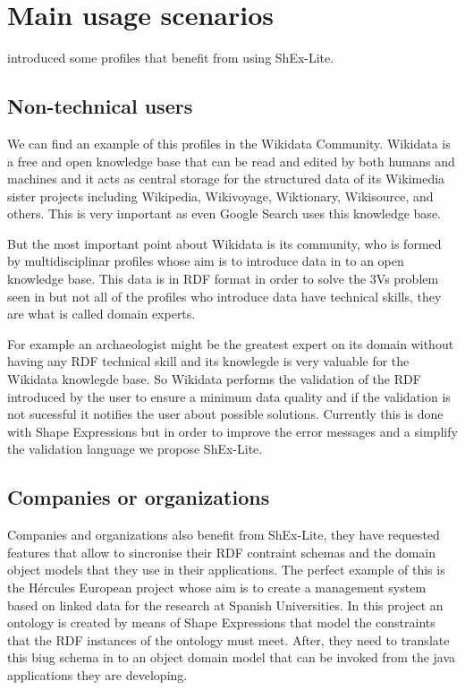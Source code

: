 \section{Main usage scenarios}

 introduced some profiles that benefit from using ShEx-Lite.

\subsection{Non-technical users}
We can find an example of this profiles in the Wikidata Community. Wikidata is a free and open knowledge base that can be read and edited by both humans and machines and it acts as central storage for the structured data of its Wikimedia sister projects including Wikipedia, Wikivoyage, Wiktionary, Wikisource, and others. This is very important as even Google Search uses this knowledge base.

But the most important point about Wikidata is its community, who is formed by multidisciplinar profiles whose aim is to introduce data in to an open knowledge base. This data is in RDF format in order to solve the 3Vs problem seen in  but not all of the profiles who introduce data have technical skills, they are what is called domain experts.

For example an archaeologist might be the greatest expert on its domain without having any RDF technical skill and its knowlegde is very valuable for the Wikidata knowlegde base. So Wikidata performs the validation of the RDF introduced by the user to ensure a minimum data quality and if the validation is not sucessful it notifies the user about possible solutions. Currently this is done with Shape Expressions but in order to improve the error messages and a simplify the validation language we propose ShEx-Lite. 

\subsection{Companies or organizations}
Companies and organizations also benefit from ShEx-Lite, they have requested features that allow to sincronise their RDF contraint schemas and the domain object models that they use in their applications. The perfect example of this is the Hércules European project whose aim is to create a management system based on linked data for the research at Spanish Universities. In this project an ontology is created by means of Shape Expressions that model the constraints that the RDF instances of the ontology must meet. After, they need to translate this biug schema in to an object domain model that can be invoked from the java applications they are developing.

